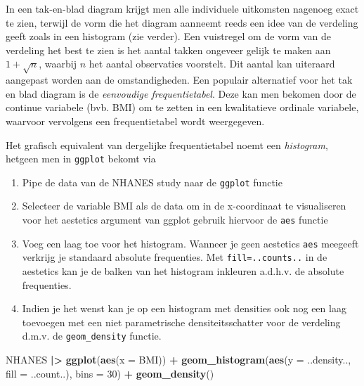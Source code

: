 \documentclass[
  12pt,dutch]{book}
\newenvironment{Shaded}{\begin{snugshade}}{\end{snugshade}}
\newcommand{\AttributeTok}[1]{\textcolor[rgb]{0.13,0.29,0.53}{#1}}
\newcommand{\DecValTok}[1]{\textcolor[rgb]{0.00,0.00,0.81}{#1}}
\newcommand{\FunctionTok}[1]{\textcolor[rgb]{0.13,0.29,0.53}{\textbf{#1}}}
\newcommand{\NormalTok}[1]{#1}
\newcommand{\SpecialCharTok}[1]{\textcolor[rgb]{0.81,0.36,0.00}{\textbf{#1}}}
\providecommand{\tightlist}{%
  \setlength{\itemsep}{0pt}\setlength{\parskip}{0pt}}
\theoremstyle{definition}
\theoremstyle{definition}
\theoremstyle{definition}
\theoremstyle{definition}
\theoremstyle{remark}
\begin{document}
In een tak-en-blad diagram krijgt men alle individuele uitkomsten nagenoeg
exact te zien, terwijl de vorm die het diagram aanneemt reeds een idee van
de verdeling geeft zoals in een histogram (zie verder). Een vuistregel om de
vorm van de verdeling het best te zien is het aantal takken ongeveer gelijk
te maken aan \(1 + \sqrt{n}\), waarbij \(n\) het aantal observaties voorstelt.
Dit aantal kan uiteraard aangepast worden aan de omstandigheden.
Een populair alternatief voor het tak en blad diagram is de \emph{eenvoudige frequentietabel}. Deze kan men bekomen door de continue variabele (bvb. BMI) om te zetten in een kwalitatieve ordinale variabele, waarvoor vervolgens een frequentietabel wordt weergegeven.

Het grafisch equivalent van dergelijke frequentietabel noemt een \emph{histogram}, hetgeen men in \texttt{ggplot} bekomt via

\begin{enumerate}
\def\labelenumi{\arabic{enumi}.}
\tightlist
\item
  Pipe de data van de NHANES study naar de \texttt{ggplot} functie
\item
  Selecteer de variable BMI als de data om in de x-coordinaat te visualiseren voor het aestetics argument van ggplot gebruik hiervoor de \texttt{aes} functie
\item
  Voeg een laag toe voor het histogram. Wanneer je geen aestetics \texttt{aes} meegeeft verkrijg je standaard absolute frequenties. Met \texttt{fill=..counts..} in de aestetics kan je de balken van het histogram inkleuren a.d.h.v. de absolute frequenties.
\item
  Indien je het wenst kan je op een histogram met densities ook nog een laag toevoegen met een niet parametrische densiteitsschatter voor de verdeling d.m.v. de \texttt{geom\_density} functie.
\end{enumerate}

\begin{Shaded}
\begin{Highlighting}[]
\NormalTok{NHANES }\SpecialCharTok{|\textgreater{}}
    \FunctionTok{ggplot}\NormalTok{(}\FunctionTok{aes}\NormalTok{(}\AttributeTok{x =}\NormalTok{ BMI)) }\SpecialCharTok{+} \FunctionTok{geom\_histogram}\NormalTok{(}\FunctionTok{aes}\NormalTok{(}\AttributeTok{y =}\NormalTok{ ..density..,}
    \AttributeTok{fill =}\NormalTok{ ..count..), }\AttributeTok{bins =} \DecValTok{30}\NormalTok{) }\SpecialCharTok{+} \FunctionTok{geom\_density}\NormalTok{()}
\end{Highlighting}
\end{Shaded}
\end{document}
